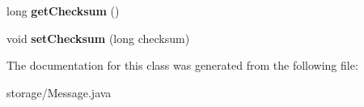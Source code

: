 \begin{DoxyCompactItemize}
\item 
\hypertarget{classstorage_1_1_message_a03e40221ddf413b28bc5cf25fa36a632}{
long {\bfseries get\-Checksum} ()}
\label{classstorage_1_1_message_a03e40221ddf413b28bc5cf25fa36a632}

\item 
\hypertarget{classstorage_1_1_message_ada4760a19d0f884e67f599f6fcf8ad05}{
void {\bfseries set\-Checksum} (long checksum)}
\label{classstorage_1_1_message_ada4760a19d0f884e67f599f6fcf8ad05}

\end{DoxyCompactItemize}


\-The documentation for this class was generated from the following file\-:\begin{DoxyCompactItemize}
\item 
storage/\-Message.\-java\end{DoxyCompactItemize}

